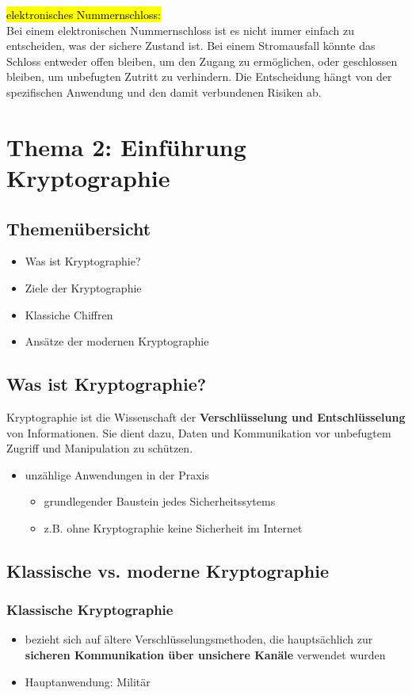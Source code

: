 \documentclass[a4paper, 10pt]{article}
\begin{document}
 \noindent\hl{elektronisches Nummernschloss:}\\
 Bei einem elektronischen Nummernschloss ist es nicht immer einfach zu entscheiden, was der sichere Zustand ist. Bei einem Stromausfall könnte das Schloss entweder offen bleiben, um den Zugang zu ermöglichen, oder geschlossen bleiben, um unbefugten Zutritt zu verhindern. Die Entscheidung hängt von der spezifischen Anwendung und den damit verbundenen Risiken ab.

 \section{Thema 2: Einführung Kryptographie}
 \subsection{Themenübersicht}
 \begin{itemize}
     \item Was ist Kryptographie?
     \item Ziele der Kryptographie
     \item Klassiche Chiffren
     \item Ansätze der modernen Kryptographie
 \end{itemize}
 \subsection{Was ist Kryptographie?}
 Kryptographie ist die Wissenschaft der \textbf{Verschlüsselung und Entschlüsselung} von Informationen. Sie dient dazu, Daten und Kommunikation vor unbefugtem Zugriff und Manipulation zu schützen. 
\begin{itemize}
    \item unzählige Anwendungen in der Praxis
    \begin{itemize}
        \item grundlegender Baustein jedes Sicherheitssytems
        \item z.B. ohne Kryptographie keine Sicherheit im Internet
    \end{itemize}
\end{itemize}
\subsection{Klassische vs. moderne Kryptographie}
\subsubsection{Klassische Kryptographie}
\begin{itemize}
    \item  bezieht sich auf ältere Verschlüsselungsmethoden, die hauptsächlich zur \textbf{sicheren Kommunikation über unsichere Kanäle} verwendet wurden
    \item Hauptanwendung: Militär
\end{itemize}
\end{document}
